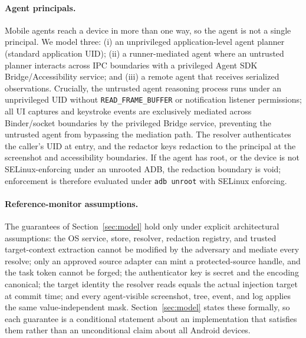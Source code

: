 \documentclass[sigconf,10pt]{acmart}
\theoremstyle{acmplain}%
\begin{document}
\paragraph{Agent principals.} Mobile agents reach a device in more than one way, so the agent is not a single principal. We model three: (i) an unprivileged application-level agent planner (standard application UID); (ii) a runner-mediated agent where an untrusted planner interacts across IPC boundaries with a privileged Agent SDK Bridge/Accessibility service; and (iii) a remote agent that receives serialized observations. Crucially, the untrusted agent reasoning process runs under an unprivileged UID without \texttt{READ\_FRAME\_BUFFER} or notification listener permissions; all UI captures and keystroke events are exclusively mediated across Binder/socket boundaries by the privileged Bridge service, preventing the untrusted agent from bypassing the mediation path. The resolver authenticates the caller's UID at entry, and the redactor keys redaction to the principal at the screenshot and accessibility boundaries. If the agent has root, or the device is not SELinux-enforcing under an unrooted ADB, the redaction boundary is void; enforcement is therefore evaluated under \texttt{adb unroot} with SELinux enforcing.

\paragraph{Reference-monitor assumptions.} The guarantees of Section~\ref{sec:model} hold only under explicit architectural assumptions: the OS service, store, resolver, redaction registry, and trusted target-context extraction cannot be modified by the adversary and mediate every resolve; only an approved source adapter can mint a protected-source handle, and the task token cannot be forged; the authenticator key is secret and the encoding canonical; the target identity the resolver reads equals the actual injection target at commit time; and every agent-visible screenshot, tree, event, and log applies the same value-independent mask. Section~\ref{sec:model} states these formally, so each guarantee is a conditional statement about an implementation that satisfies them rather than an unconditional claim about all Android devices.
\end{document}
